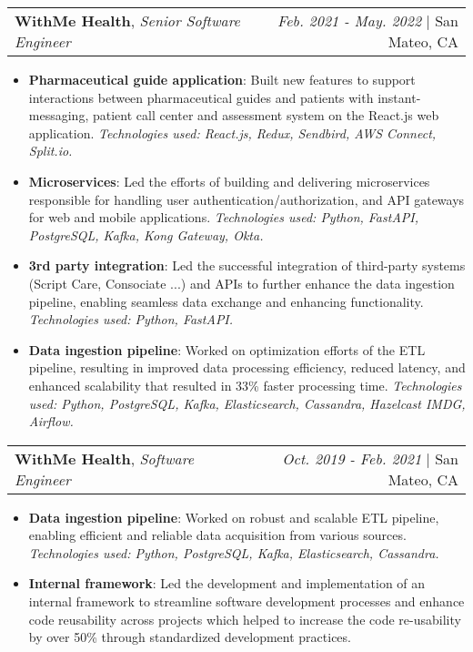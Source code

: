 \documentclass[letterpaper,11pt]{article}
\makeatletter
\newcommand{\experienceItem}[2]{
  \item\small{
    \textbf{#1}{: #2 \vspace{-2pt}}
  }
}
\newcommand{\experienceSubHeading}[4]{
  \vspace{-1pt}\item
    \begin{tabular*}{0.97\textwidth}{l@{\extracolsep{\fill}}r}
      \textbf{#1}, \textit{\small #3} & \textit{\small #4} | #2 \\
    \end{tabular*}\vspace{-5pt}
}
\newcommand{\resumeItemListStart}{\begin{itemize}[leftmargin=*]}
\newcommand{\resumeItemListEnd}{\end{itemize}}
\makeatother
\begin{document}
    \experienceSubHeading
      {WithMe Health}{San Mateo, CA}
      {Senior Software Engineer}{Feb. 2021 - May. 2022}
      \resumeItemListStart
        \experienceItem{Pharmaceutical guide application}
          {Built new features to support interactions between pharmaceutical guides and patients with instant-messaging, patient call center and assessment system on the React.js web application. \textit{Technologies used: React.js, Redux, Sendbird, AWS Connect, Split.io.}}
        \experienceItem{Microservices}
          {Led the efforts of building and delivering microservices responsible for handling user authentication/authorization, and API gateways for web and mobile applications. \textit{Technologies used: Python, FastAPI, PostgreSQL, Kafka, Kong Gateway, Okta.}}
        \experienceItem{3rd party integration}
          {Led the successful integration of third-party systems (Script Care, Consociate ...) and APIs to further enhance the data ingestion pipeline, enabling seamless data exchange and enhancing functionality. \textit{Technologies used: Python, FastAPI.}}
        \experienceItem{Data ingestion pipeline}
          {Worked on optimization efforts of the ETL pipeline, resulting in improved data processing efficiency, reduced latency, and enhanced scalability that resulted in 33\% faster processing time. \textit{Technologies used: Python, PostgreSQL, Kafka, Elasticsearch, Cassandra, Hazelcast IMDG, Airflow.}}
      \resumeItemListEnd

    \experienceSubHeading
      {WithMe Health}{San Mateo, CA}
      {Software Engineer}{Oct. 2019 - Feb. 2021}
      \resumeItemListStart
        \experienceItem{Data ingestion pipeline}
          {Worked on robust and scalable ETL pipeline, enabling efficient and reliable data acquisition from various sources. \textit{Technologies used: Python, PostgreSQL, Kafka, Elasticsearch, Cassandra.}}
        \experienceItem{Internal framework}
          {Led the development and implementation of an internal framework to streamline software development processes and enhance code reusability across projects which helped to increase the code re-usability by over 50\% through standardized development practices.}
      \resumeItemListEnd
\end{document}
